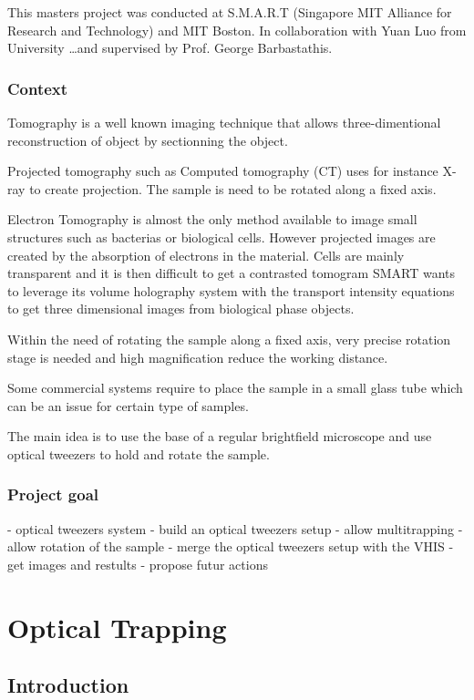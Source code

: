 \documentclass{kepfl}
\begin{document}
This masters project was conducted at S.M.A.R.T (Singapore MIT Alliance for Research and Technology) and MIT Boston. 
In collaboration with Yuan Luo from University \ldots and supervised by Prof. George Barbastathis.

\subsection{Context}
Tomography is a well known imaging technique that allows three-dimentional reconstruction of object by sectionning the object. 

Projected tomography such as Computed tomography (CT) uses for instance X-ray to create projection.
The sample is need to be rotated along a fixed axis. 

Electron Tomography is almost the only method available to image small structures such as bacterias or biological cells. 
However projected images are created by the absorption of electrons in the material. Cells are mainly transparent and it is then difficult to get a contrasted tomogram
SMART wants to leverage its volume holography system with the transport intensity equations to get three dimensional images from biological phase objects. 

Within the need of rotating the sample along a fixed axis, very precise rotation stage is needed and high magnification reduce the working distance. 

Some commercial systems require to place the sample in a small glass tube which can be an issue for certain type of samples. 

The main idea is to use the base of a regular brightfield microscope and use optical tweezers to hold and rotate the sample.

\subsection{Project goal}
- optical tweezers system
- build an optical tweezers setup
- allow multitrapping
- allow rotation of the sample
- merge the optical tweezers setup with the VHIS
- get images and restults
- propose futur actions

\chapter{Optical Trapping}
\section{Introduction}
\end{document}

